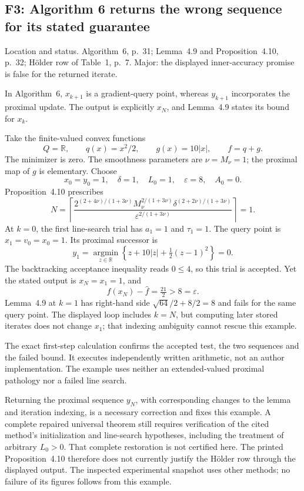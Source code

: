 \documentclass[10pt]{article}
\begin{document}
\subsection*{F3: Algorithm 6 returns the wrong sequence for its stated guarantee}
Location and status. Algorithm 6, p. 31; Lemma 4.9 and Proposition 4.10, p. 32; Hölder row of Table 1, p. 7. Major: the displayed inner-accuracy promise is false for the returned iterate.\par
In Algorithm 6, \(x_{k+1}\) is a gradient-query point, whereas \(y_{k+1}\) incorporates the proximal update. The output is explicitly \(x_N\), and Lemma 4.9 states its bound for \(x_k\).\par
Take the finite-valued convex functions \[Q=\mathbb R,\qquad q(x)=x^2/2,\qquad g(x)=10|x|,
 \qquad f=q+g.\] The minimizer is zero. The smoothness parameters are \(\nu=M_\nu=1\); the proximal map of \(g\) is elementary. Choose \[x_0=y_0=1,\quad \delta=1,\quad L_0=1,\quad
 \varepsilon=8,\quad A_0=0.\] Proposition 4.10 prescribes \[N=\left\lceil
  \frac{2^{(2+4\nu)/(1+3\nu)}
         M_\nu^{2/(1+3\nu)}
         \delta^{(2+2\nu)/(1+3\nu)}}
       {\varepsilon^{2/(1+3\nu)}}\right\rceil=1.\] At \(k=0\), the first line-search trial has \(a_1=1\) and \(\tau_1=1\). The query point is \(x_1=v_0=x_0=1\). Its proximal successor is \[y_1=\operatorname*{argmin}_{z\in\mathbb R}
 \left\{z+10|z|+\tfrac12(z-1)^2\right\}=0 .\] The backtracking acceptance inequality reads \(0\le4\), so this trial is accepted. Yet the stated output is \(x_N=x_1=1\), and \[f(x_N)-\widehat f=\tfrac{21}{2}>8=\varepsilon.\] Lemma 4.9 at \(k=1\) has right-hand side \(\sqrt{64}/2+8/2=8\) and fails for the same query point. The displayed loop includes \(k=N\), but computing later stored iterates does not change \(x_1\); that indexing ambiguity cannot rescue this example.\par
The exact first-step calculation confirms the accepted test, the two sequences and the failed bound. It executes independently written arithmetic, not an author implementation. The example uses neither an extended-valued proximal pathology nor a failed line search.\par
Returning the proximal sequence \(y_N\), with corresponding changes to the lemma and iteration indexing, is a necessary correction and fixes this example. A complete repaired universal theorem still requires verification of the cited method’s initialization and line-search hypotheses, including the treatment of arbitrary \(L_0>0\). That complete restoration is not certified here. The printed Proposition 4.10 therefore does not currently justify the Hölder row through the displayed output. The inspected experimental snapshot uses other methods; no failure of its figures follows from this example.\par
\end{document}
